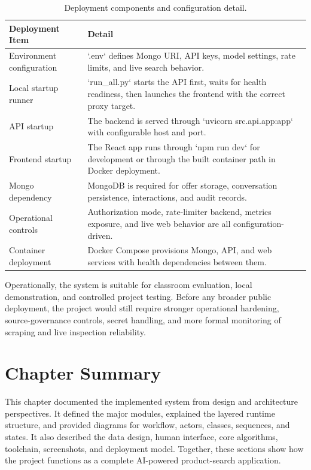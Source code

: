 \documentclass[12pt,a4paper,oneside]{report}
\begin{document}
\begin{table}[H]
\centering
\small
\setlength{\tabcolsep}{4pt}
\renewcommand{\arraystretch}{1.08}
\caption{Deployment components and configuration detail.}
\label{tab:deployment-components}
\begin{tabular}{|L{0.28\textwidth}|L{0.56\textwidth}|}
\hline
\textbf{Deployment Item} & \textbf{Detail} \\
\hline
Environment configuration & `.env` defines Mongo URI, API keys, model settings, rate limits, and live search behavior. \\
\hline
Local startup runner & `run\_all.py` starts the API first, waits for health readiness, then launches the frontend with the correct proxy target. \\
\hline
API startup & The backend is served through `uvicorn src.api.app:app` with configurable host and port. \\
\hline
Frontend startup & The React app runs through `npm run dev` for development or through the built container path in Docker deployment. \\
\hline
Mongo dependency & MongoDB is required for offer storage, conversation persistence, interactions, and audit records. \\
\hline
Operational controls & Authorization mode, rate-limiter backend, metrics exposure, and live web behavior are all configuration-driven. \\
\hline
Container deployment & Docker Compose provisions Mongo, API, and web services with health dependencies between them. \\
\hline
\end{tabular}
\end{table}

Operationally, the system is suitable for classroom evaluation, local demonstration, and controlled project testing. Before any broader public deployment, the project would still require stronger operational hardening, source-governance controls, secret handling, and more formal monitoring of scraping and live inspection reliability.

\section{Chapter Summary}
This chapter documented the implemented system from design and architecture perspectives. It defined the major modules, explained the layered runtime structure, and provided diagrams for workflow, actors, classes, sequences, and states. It also described the data design, human interface, core algorithms, toolchain, screenshots, and deployment model. Together, these sections show how the project functions as a complete AI-powered product-search application.
\end{document}
